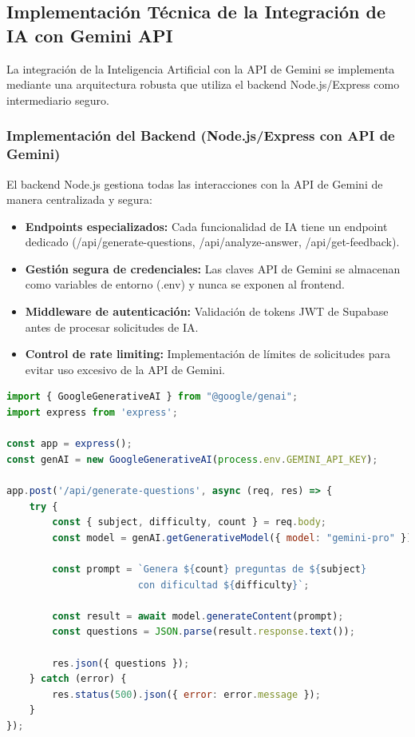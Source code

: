 \documentclass[12pt,a4paper]{report}
\begin{document}
\subsection{Implementación Técnica de la Integración de IA con Gemini API}

La integración de la Inteligencia Artificial con la API de Gemini se implementa mediante una arquitectura robusta que utiliza el backend Node.js/Express como intermediario seguro.

\subsubsection{Implementación del Backend (Node.js/Express con API de Gemini)}

El backend Node.js gestiona todas las interacciones con la API de Gemini de manera centralizada y segura:

\begin{itemize}
\item \textbf{Endpoints especializados:} Cada funcionalidad de IA tiene un endpoint dedicado (/api/generate-questions, /api/analyze-answer, /api/get-feedback).

\item \textbf{Gestión segura de credenciales:} Las claves API de Gemini se almacenan como variables de entorno (.env) y nunca se exponen al frontend.

\item \textbf{Middleware de autenticación:} Validación de tokens JWT de Supabase antes de procesar solicitudes de IA.

\item \textbf{Control de rate limiting:} Implementación de límites de solicitudes para evitar uso excesivo de la API de Gemini.
\end{itemize}

\begin{lstlisting}[language=JavaScript, caption=Implementación del backend con Gemini API]
import { GoogleGenerativeAI } from "@google/genai";
import express from 'express';

const app = express();
const genAI = new GoogleGenerativeAI(process.env.GEMINI_API_KEY);

app.post('/api/generate-questions', async (req, res) => {
    try {
        const { subject, difficulty, count } = req.body;
        const model = genAI.getGenerativeModel({ model: "gemini-pro" });
        
        const prompt = `Genera ${count} preguntas de ${subject} 
                       con dificultad ${difficulty}`;
        
        const result = await model.generateContent(prompt);
        const questions = JSON.parse(result.response.text());
        
        res.json({ questions });
    } catch (error) {
        res.status(500).json({ error: error.message });
    }
});
\end{lstlisting}
\end{document}
